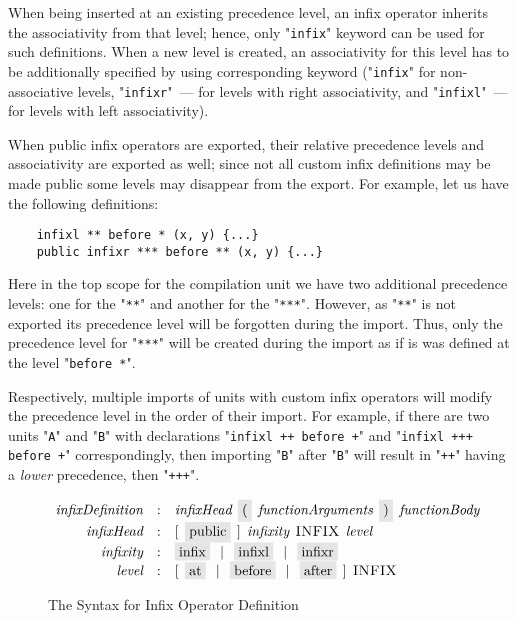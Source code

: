 When being inserted at an existing precedence level, an infix operator inherits the associativity from that level; hence, only "\lstinline|infix|"
keyword can be used for such definitions. When a new level is created, an associativity for this level has to be additionally specified
by using corresponding keyword ("\lstinline|infix|" for non-associative levels, "\lstinline|infixr|"~--- for levels with right
associativity, and "\lstinline|infixl|"~--- for levels with left associativity).

When public infix operators are exported, their relative precedence levels and associativity are exported as well; since not all 
custom infix definitions may be made public some levels may disappear from the export. For example, let us have the following definitions:

\begin{lstlisting}
    infixl ** before * (x, y) {...}
    public infixr *** before ** (x, y) {...}
\end{lstlisting}

Here in the top scope for the compilation unit we have two additional precedence levels: one for the "\lstinline|**|" and another for the "\lstinline|***|".
However, as  "\lstinline|**|" is not exported its precedence level will be forgotten during the import. Thus, only the precedence level for
"\lstinline|***|" will be created during the import as if is was defined at the level  "\lstinline|before *|".

Respectively, multiple imports of units with custom infix operators will modify the precedence level in the order of their import. For example,
if there are two units  "\lstinline|A|" and  "\lstinline|B|" with declarations "\lstinline|infixl ++ before +|" and "\lstinline|infixl +++ before +|"
correspondingly, then importing  "\lstinline|B|" after  "\lstinline|B|" will result in "\lstinline|++|" having a \emph{lower} precedence, then
"\lstinline|+++|".

\begin{figure}[t]
  \[
    \begin{array}{rcl}
      \defterm{infixDefinition} & : & \nonterm{infixHead}\s\term{(}\s\nonterm{functionArguments}\s\term{)}\s\nonterm{functionBody}\\
      \defterm{infixHead}       & : & [\s\term{public}\s]\s\nonterm{infixity}\s\token{INFIX}\s\nonterm{level}\\
      \defterm{infixity}        & : & \term{infix}\alt\term{infixl}\alt\term{infixr}\\
      \defterm{level}           & : & [\s\term{at}\alt\term{before}\alt\term{after}\s]\s\token{INFIX}
    \end{array}
  \]
  \caption{The Syntax for Infix Operator Definition}
  \label{custom_infix_construct}
\end{figure}

